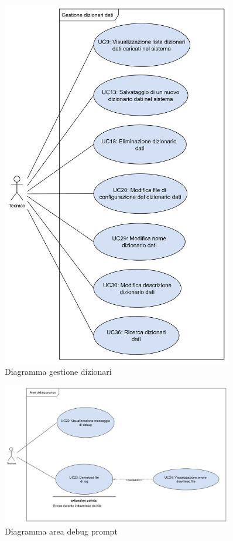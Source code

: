 











\begin{figure}[H]
  \centering
  \includegraphics[width=0.90\textwidth, height=0.95\textheight]{assets/gestione_dizionari.png}
  \caption{Diagramma gestione dizionari}
\end{figure}









\begin{figure}[H]
  \centering
  \includegraphics[width=0.90\textwidth]{assets/debug.png}
  \caption{Diagramma area debug prompt}
\end{figure}
